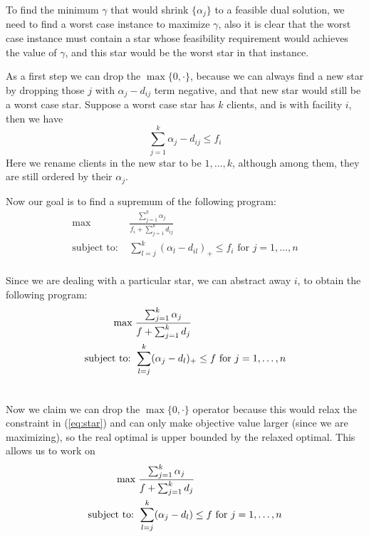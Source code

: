 \documentclass[oneside,final]{ucr}
\begin{document}
To find the minimum $\gamma$ that would shrink
$\{\alpha_j\}$ to a feasible dual solution, we need to find
a worst case instance to maximize $\gamma$, also it is clear
that the worst case instance must contain a star whose
feasibility requirement would achieves the value of
$\gamma$, and this star would be the worst star in that
instance.

As a first step we can drop the $\max\{0, \cdot\}$, because
we can always find a new star by dropping those $j$ with
$\alpha_j - d_{ij}$ term negative, and that new star would
still be a worst case star. Suppose a worst case star has
$k$ clients, and is with facility $i$, then we have
\begin{equation*}
  \sum_{j=1}^k \alpha_j - d_{ij} \leq f_i
\end{equation*}
Here we rename clients in the new star to be $1,\ldots,k$,
although among them, they are still ordered by their
$\alpha_j$.

Now our goal is to find a supremum of the following program:
\begin{align*}
  \max\; & \frac{\sum_{j=1}^k \alpha_j}{f_i + \sum_{j=1}^k d_{ij}}\\
  \textrm{subject to: } & \sum_{l=j}^k (\alpha_l -
  d_{il})_+\leq f_i \textrm{ for } j=1,\ldots,n\\
\end{align*}

Since we are dealing with a particular star, we can abstract
away $i$, to obtain the following program:
\begin{align}
  \label{eq:star}
  \max\; & \frac{\sum_{j=1}^k \alpha_j}{f + \sum_{j=1}^k
    d_j}\\ \notag
  \textrm{subject to: } & \sum_{l=j}^k (\alpha_j - d_{l})_+
  \leq f \textrm{ for } j=1,\ldots,n\\ \notag
\end{align}

Now we claim we can drop the $\max\{0, \cdot\}$ operator
because this would relax the constraint in (\ref{eq:star})
and can only make objective value larger (since we are
maximizing), so the real optimal is upper bounded by the
relaxed optimal. This allows us to work on
\begin{align}
  \label{eq:frlp}
  \max\; & \frac{\sum_{j=1}^k \alpha_j}{f + \sum_{j=1}^k
    d_j}\\ \notag
  \textrm{subject to: } & \sum_{l=j}^k (\alpha_j - d_{l})
  \leq f \textrm{ for } j=1,\ldots,n\\ \notag
\end{align}
\end{document}
